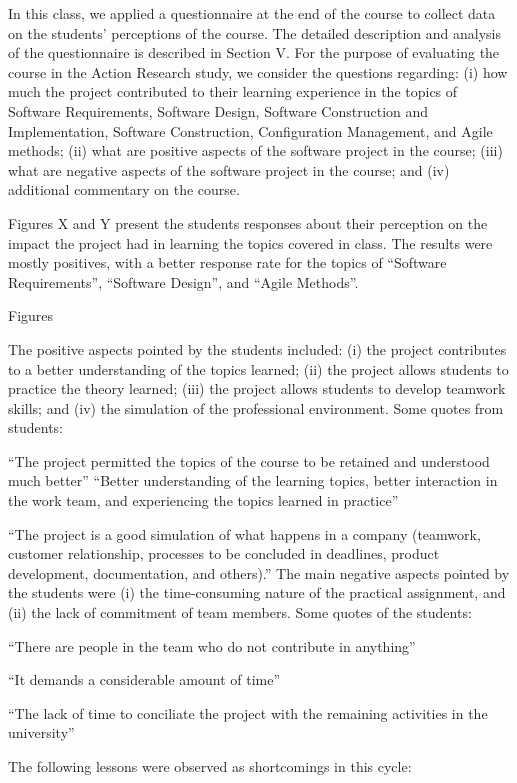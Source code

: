In this class, we applied a questionnaire at the end of the course to collect data on the students’ perceptions of the course. The detailed description and analysis of the questionnaire is described in Section V. For the purpose of evaluating the course in the Action Research study, we consider the questions regarding: (i) how much the project contributed to their learning experience in the topics of Software Requirements, Software Design, Software Construction and Implementation, Software Construction, Configuration Management, and Agile methods; (ii) what are positive aspects of the software project in the course; (iii) what are negative aspects of the software project in the course; and (iv) additional commentary on the course.

Figures X and Y present the students responses about their perception on the impact the project had in learning the topics covered in class. The results were mostly positives, with a better response rate for the topics of “Software Requirements”, “Software Design”, and “Agile Methods”.

Figures

The positive aspects pointed by the students included: (i) the project contributes to a better understanding of the topics learned; (ii) the project allows students to practice the theory learned; (iii) the project allows students to develop teamwork skills; and (iv) the simulation of the professional environment. Some quotes from students:

“The project permitted the topics of the course to be retained and understood much better”
“Better understanding of the learning topics, better interaction in the work team, and experiencing the topics learned in practice”

“The project is a good simulation of what happens in a company (teamwork, customer relationship, processes to be concluded in deadlines, product development, documentation, and others).”
The main negative aspects pointed by the students were (i) the time-consuming nature of the practical assignment, and (ii) the lack of commitment of team members. Some quotes of the students:

“There are people in the team who do not contribute in anything”

“It demands a considerable amount of time”

“The lack of time to conciliate the project with the remaining activities in the university”

The following lessons were observed as shortcomings in this cycle:


